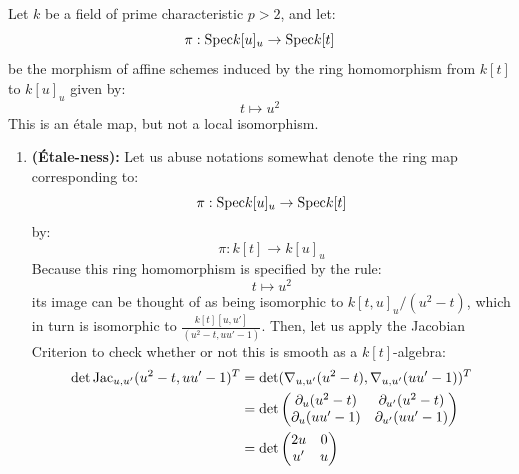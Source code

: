             \begin{example}
                Let $k$ be a field of prime characteristic $p > 2$, and let:
                    $$\pi: \Spec k[u]_u \to \Spec k[t]$$
                be the morphism of affine schemes induced by the ring homomorphism from $k[t]$ to $k[u]_u$ given by:
                    $$t \mapsto u^2$$
                This is an \'etale map, but not a local isomorphism.
                    \begin{enumerate}
                        \item \textbf{(\'Etale-ness):} Let us abuse notations somewhat denote the ring map corresponding to:
                            $$\pi: \Spec k[u]_u \to \Spec k[t]$$
                        by:
                            $$\pi: k[t] \to k[u]_u$$
                        Because this ring homomorphism is specified by the rule:
                            $$t \mapsto u^2$$
                        its image can be thought of as being isomorphic to $k[t, u]_u/(u^2 - t)$, which in turn is isomorphic to $\frac{k[t][u, u']}{(u^2 - t, uu' - 1)}$. Then, let us apply the Jacobian Criterion to check whether or not this is smooth as a $k[t]$-algebra:
                            $$
                                \begin{aligned}
                                    \det \Jac_{u, u'} (u^2 - t, uu' - 1)^T & = \det (\nabla_{u, u'} (u^2 - t), \nabla_{u, u'} (uu' - 1))^T
                                    \\
                                    & = \det
                                        \begin{pmatrix}
                                            \del_u (u^2 - t) & \del_{u'} (u^2 - t)
                                            \\
                                            \del_u (uu' - 1) & \del_{u'} (uu' - 1)
                                        \end{pmatrix}
                                    \\
                                    & = \det
                                        \begin{pmatrix}
                                            2u & 0
                                            \\
                                            u' & u
                                        \end{pmatrix}

\end{aligned}$$
\end{enumerate}
\end{example}
